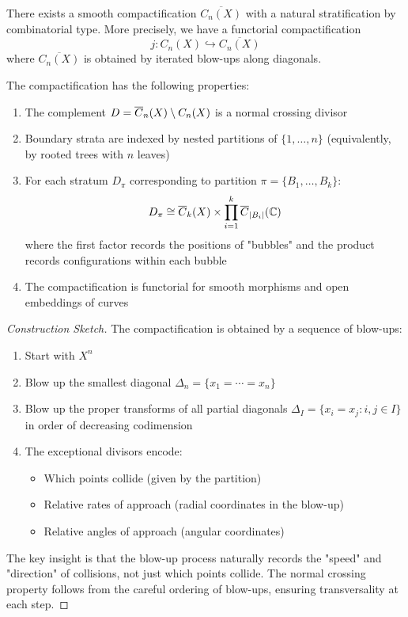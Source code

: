 \begin{theorem}\label{thm:FM}
There exists a smooth compactification $\overline{C_n(X)}$ with a natural stratification by combinatorial type. More precisely, we have
a functorial compactification
\[j: C_n(X) \hookrightarrow \overline{C_n(X)}\]
where $\overline{C_n(X)}$ is obtained by iterated blow-ups along diagonals.

The compactification has the following properties:
\begin{enumerate}
\item The complement $D = \overline{C}_n(X) \setminus C_n(X)$ is a normal crossing divisor
\item Boundary strata are indexed by nested partitions of $\{1, \ldots, n\}$ (equivalently, by rooted trees with $n$ leaves)
\item For each stratum $D_\pi$ corresponding to partition $\pi = \{B_1, \ldots, B_k\}$:
\[
D_\pi \cong \overline{C}_k(X) \times \prod_{i=1}^k \overline{C}_{|B_i|}(\mathbb{C})
\]
where the first factor records the positions of "bubbles" and the product records configurations within each bubble
\item The compactification is functorial for smooth morphisms and open embeddings of curves
\end{enumerate}
\end{theorem}
 
\begin{proof}[Construction Sketch]
The compactification is obtained by a sequence of blow-ups:
\begin{enumerate}
\item Start with $X^n$
\item Blow up the smallest diagonal $\Delta_n = \{x_1 = \cdots = x_n\}$
\item Blow up the proper transforms of all partial diagonals $\Delta_I = \{x_i = x_j : i,j \in I\}$ in order of decreasing codimension
\item The exceptional divisors encode:
\begin{itemize}
\item Which points collide (given by the partition)
\item Relative rates of approach (radial coordinates in the blow-up)
\item Relative angles of approach (angular coordinates)
\end{itemize}
\end{enumerate}
 
The key insight is that the blow-up process naturally records the "speed" and "direction" of collisions, not just which points collide. The normal crossing property follows from the careful ordering of blow-ups, ensuring transversality at each step.
\end{proof}
 
